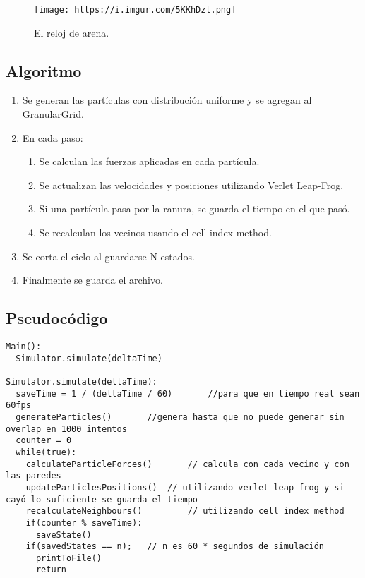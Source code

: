 \documentclass{article}
\begin{document}
\begin{figure}[!h]
  \centerline{\texttt{[image: https://i.imgur.com/5KKhDzt.png]}}
  \caption{El reloj de arena.}
  \label{fig:boat1}
\end{figure}


\subsection{Algoritmo}
\begin{enumerate}
  \item Se generan las partículas con distribución uniforme y se agregan al GranularGrid.
  \item En cada paso:
  \begin{enumerate}
    \item Se calculan las fuerzas aplicadas en cada partícula.
    \item Se actualizan las velocidades y posiciones utilizando Verlet Leap-Frog.
    \item Si una partícula pasa por la ranura, se guarda el tiempo en el que pasó.
    \item Se recalculan los vecinos usando el cell index method.
  \end{enumerate}
  \item Se corta el ciclo al guardarse N estados.
  \item Finalmente se guarda el archivo.
\end{enumerate}


\subsection{Pseudocódigo}
\begin{verbatim}
Main():
  Simulator.simulate(deltaTime)

Simulator.simulate(deltaTime):
  saveTime = 1 / (deltaTime / 60) 		//para que en tiempo real sean 60fps
  generateParticles()		//genera hasta que no puede generar sin overlap en 1000 intentos
  counter = 0
  while(true):
    calculateParticleForces()		// calcula con cada vecino y con las paredes
    updateParticlesPositions()	// utilizando verlet leap frog y si cayó lo suficiente se guarda el tiempo
    recalculateNeighbours() 		// utilizando cell index method
    if(counter % saveTime):
      saveState()
    if(savedStates == n);	// n es 60 * segundos de simulación
      printToFile()
      return
\end{verbatim}
\end{document}
